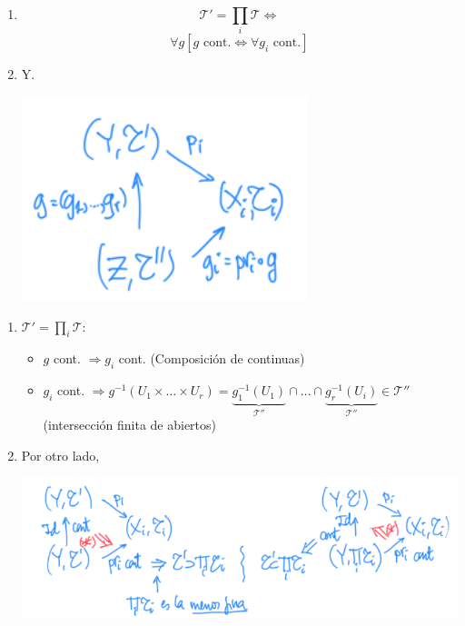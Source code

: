 \begin{theo}
\begin{enumerate}
    \item
    \[
    \mathcal{T}' = \prod_{i} \mathcal{T} \Leftrightarrow  
    \]
    \begin{equation}
        \forall g \left[ g \text{ cont.} \Leftrightarrow \forall g_i \text{ cont.} \right]
    \end{equation}

    \item Y.
    \begin{center}
        \includegraphics[scale=0.3]{images/caracterizacion_top_prod} 
    \end{center}
\end{enumerate}
\end{theo}
\begin{demo}
\begin{enumerate}
    \item $\mathcal{T}' = \prod_{i} \mathcal{T}: $ 
    \begin{itemize}
        \item $g$ cont. $\Rightarrow g_i$ cont. (Composición de continuas)
        \item $g_i$ cont. $\Rightarrow g^{-1}\left( U_1 \times \ldots \times U_r \right) = \underbrace{g_1^{-1}\left( U_1 \right)}_{\mathcal{T}''} \cap \ldots \cap \underbrace{g_r^{-1}\left( U_i \right)}_{\mathcal{T}''} \in \mathcal{T}''$ (intersección finita de abiertos) 
    \end{itemize}

    \item Por otro lado,
    \begin{center}
        \includegraphics[scale=0.4]{images/dem_carac_top_prod} 
    \end{center}
\end{enumerate}
\end{demo}


